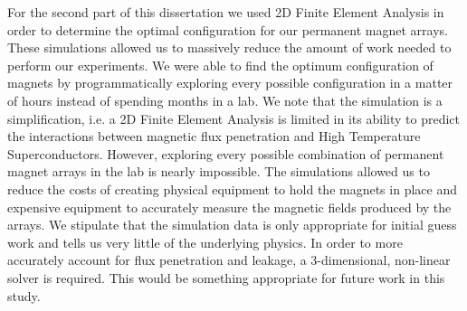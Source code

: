 For the second part of this dissertation we used 2D Finite Element Analysis in order to determine the optimal configuration for our permanent magnet arrays. These simulations allowed us to massively reduce the amount of work needed to perform our experiments. We were able to find the optimum configuration of magnets by programmatically exploring every possible configuration in a matter of hours instead of spending months in a lab. We note that the simulation is a simplification, i.e. a 2D Finite Element Analysis is limited in its ability to predict the interactions between magnetic flux penetration and High Temperature Superconductors. However, exploring every possible combination of permanent magnet arrays in the lab is nearly impossible. The simulations allowed us to reduce the costs of creating physical equipment to hold the magnets in place and expensive equipment to accurately measure the magnetic fields produced by the arrays. We stipulate that the simulation data is only appropriate for initial guess work and tells us very little of the underlying physics. In order to more accurately account for flux penetration and leakage, a 3-dimensional, non-linear solver is required. This would be something appropriate for future work in this study.